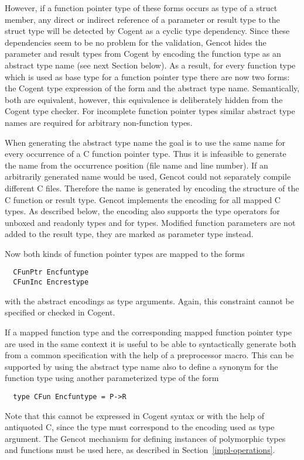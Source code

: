 However, if a function pointer type of these forms occurs as type of a struct member, any direct or indirect reference of a
parameter or result type to the struct type will be detected by Cogent as a cyclic type dependency. Since 
these dependencies seem to be no problem for the validation, Gencot hides the parameter and result types from
Cogent by encoding the function type as an abstract type name (see next Section below). As a result, for 
every function type which is used as base type for a function pointer type there are now two forms: the Cogent
type expression of the form  and the abstract type name. Semantically, both are equivalent, however,
this equivalence is deliberately hidden from the Cogent type checker. For incomplete function pointer types similar
abstract type names are required for arbitrary non-function types.

When generating the abstract type name the goal is to use the same name 
for every occurrence of a C function pointer type. Thus it is infeasible to generate the name from 
the occurrence position (file name and line number). If an arbitrarily generated name would be used, 
Gencot could not separately compile different C files. Therefore the name is generated by encoding the structure of the 
C function or result type. Gencot implements the encoding for all mapped C types. As described
below, the encoding also supports the type operators for unboxed and readonly types and for  types.
Modified function parameters are not added to the result type, they are marked as parameter type instead.

Now both kinds of function pointer types are mapped to the forms
\begin{verbatim}
  CFunPtr Encfuntype
  CFunInc Encrestype
\end{verbatim}
with the abstract encodings as type arguments. Again, this constraint cannot be specified or checked in Cogent.

If a mapped function type and the corresponding mapped function pointer type are used in the same context it is useful to 
be able to syntactically generate both from a common specification with the help of a preprocessor macro. This can be
supported by using the abstract type name also to define a synonym for the function type using another parameterized
type of the form
\begin{verbatim}
  type CFun Encfuntype = P->R
\end{verbatim}
Note that this cannot be expressed in Cogent syntax or with the help of antiquoted C, since the type  must
correspond to the encoding used as type argument. The Gencot mechanism for defining instances of polymorphic types and
functions must be used here, as described in Section~\ref{impl-operations}.

